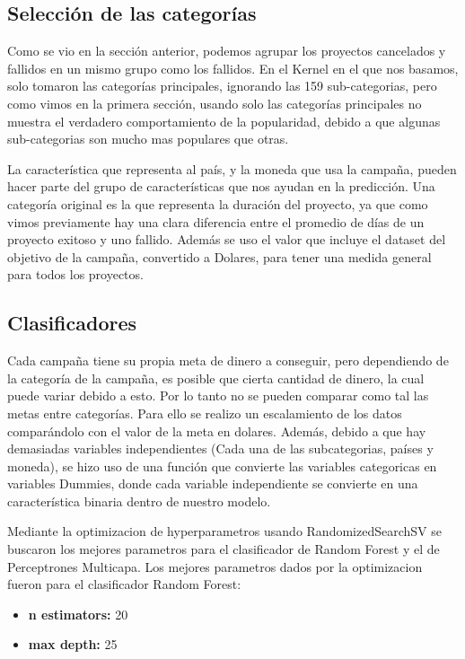 \documentclass[journal]{IEEEtran}
\begin{document}
\subsection{Selección de las categorías}
Como se vio en la sección anterior, podemos agrupar los proyectos cancelados y fallidos en un mismo grupo como los fallidos. En el Kernel en el que nos basamos, solo tomaron las categorías principales, ignorando las 159 sub-categorias, pero como vimos en la primera sección, usando solo las categorías principales no muestra el verdadero comportamiento de la popularidad, debido a que algunas sub-categorias son mucho mas populares que otras.

La característica que representa al país, y la moneda que usa la campaña, pueden hacer parte del grupo de características que nos ayudan en la predicción. Una categoría original es la que representa la duración del proyecto, ya que como vimos previamente hay una clara diferencia entre el promedio de días de un proyecto exitoso y uno fallido. Además se uso el valor que incluye el dataset del objetivo de la campaña, convertido a Dolares, para tener una medida general para todos los proyectos.

\subsection{Clasificadores}
Cada campaña tiene su propia meta de dinero a conseguir, pero dependiendo de la categoría de la campaña, es posible que cierta cantidad de dinero, la cual puede variar debido a esto. Por lo tanto no se pueden comparar como tal las metas entre categorías. Para ello se realizo un escalamiento de los datos comparándolo con el valor de la meta en dolares. Además, debido a que hay demasiadas variables independientes (Cada una de las subcategorias, países y moneda), se hizo uso de una función que convierte las variables categoricas en variables Dummies, donde cada variable independiente se convierte en una característica binaria dentro de nuestro modelo.

Mediante la optimizacion de hyperparametros usando RandomizedSearchSV se buscaron los mejores parametros para el clasificador de Random Forest y el de Perceptrones Multicapa. Los mejores parametros dados por la optimizacion fueron para el clasificador Random Forest:

\begin{itemize}
	\item \textbf{n estimators:} 20
	\item \textbf{max depth:} 25
\end{itemize}
\end{document}
